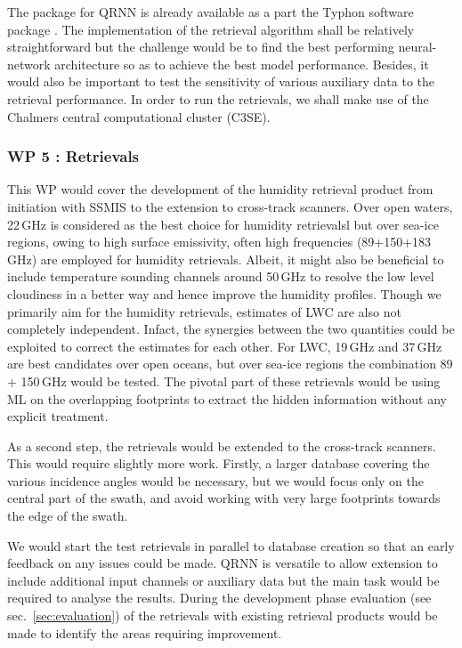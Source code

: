 \documentclass[12pt,oneside,a4paper]{article}
\begin{document}
The package for QRNN is already available as a part the Typhon software package \citep{lemke:2020:typhon}. The implementation of the retrieval algorithm shall be relatively straightforward but the challenge would be to find the best performing neural-network architecture so as to achieve the best model performance. Besides, it would also be important to test the sensitivity of various auxiliary data to the retrieval performance. In order to run the retrievals, we shall make use of the Chalmers central computational cluster (C3SE).


\subsubsection*{WP 5 : Retrievals}
%
\label{sec:retrievals}
%
This WP would cover the development of the humidity retrieval product from initiation with SSMIS to the extension to cross-track scanners. Over open waters, 22\,GHz is considered as the best choice for humidity retrievalsl but over sea-ice regions, owing to high surface emissivity, often high frequencies (89+150+183\,GHz) are employed for humidity retrievals. Albeit, it might also be beneficial to include temperature sounding channels around 50\,GHz to resolve the low level cloudiness in a better way and hence improve the humidity profiles. Though we primarily aim for the humidity retrievals, estimates of LWC are also not completely independent. Infact, the synergies between the two quantities could be exploited to correct the estimates for each other. For LWC, 19\,GHz and 37\,GHz are best candidates over open oceans, but over sea-ice regions the combination 89 + 150\,GHz would be tested. The pivotal part of these retrievals would be using ML on the overlapping footprints to extract the hidden information without any explicit treatment. 

As a second step, the retrievals would be extended to the cross-track scanners. This would require slightly more work. Firstly, a larger database covering the various incidence angles would be necessary, but we would focus only on the central part of the swath, and avoid working with very large footprints towards the edge of the swath. 


We would start the test retrievals in parallel to database creation so that an early feedback on any issues could be made. QRNN is versatile to allow extension to include additional input channels or auxiliary data but the main task would be required to analyse the results. During the development phase evaluation (see sec.~\ref{sec:evaluation}) of the retrievals with existing retrieval products would be made to identify the areas requiring improvement.
\end{document}

